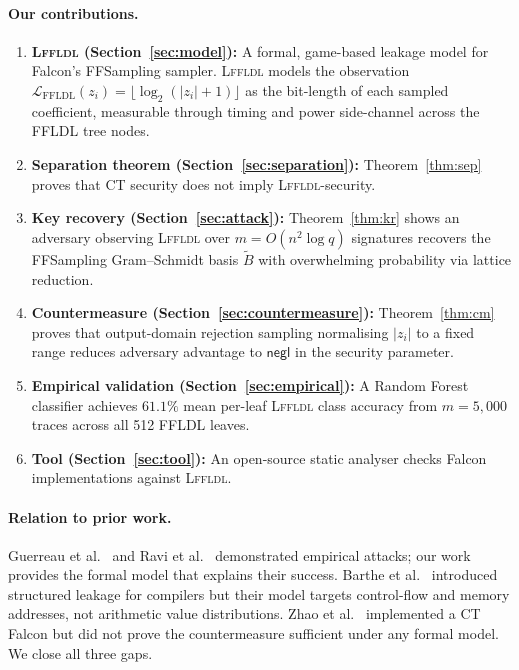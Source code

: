 \documentclass[sigconf,anonymous]{acmart}
\begin{document}
\paragraph{Our contributions.}
\begin{enumerate}
  \item \textbf{\textsc{Lffldl} (Section~\ref{sec:model}):} A formal,
    game-based leakage model for Falcon's FFSampling sampler.
    \textsc{Lffldl} models the observation
    $\mathcal{L}_{\mathrm{FFLDL}}(z_i) = \lfloor\log_2(|z_i|+1)\rfloor$
    as the bit-length of each sampled coefficient, measurable through timing
    and power side-channel across the FFLDL tree nodes.
  \item \textbf{Separation theorem (Section~\ref{sec:separation}):}
    Theorem~\ref{thm:sep} proves that CT security does not imply
    \textsc{Lffldl}-security.
  \item \textbf{Key recovery (Section~\ref{sec:attack}):}
    Theorem~\ref{thm:kr} shows an adversary observing \textsc{Lffldl} over
    $m = O(n^2\log q)$ signatures recovers the FFSampling Gram--Schmidt basis
    $\widetilde{B}$ with overwhelming probability via lattice reduction.
  \item \textbf{Countermeasure (Section~\ref{sec:countermeasure}):}
    Theorem~\ref{thm:cm} proves that output-domain rejection sampling
    normalising $|z_i|$ to a fixed range reduces adversary advantage to
    $\mathsf{negl}$ in the security parameter.
  \item \textbf{Empirical validation (Section~\ref{sec:empirical}):}
    A Random Forest classifier achieves $61.1\%$ mean per-leaf
    \textsc{Lffldl} class accuracy from $m = 5{,}000$ traces across all
    512 FFLDL leaves.
  \item \textbf{Tool (Section~\ref{sec:tool}):} An open-source static
    analyser checks Falcon implementations against \textsc{Lffldl}.
\end{enumerate}

\paragraph{Relation to prior work.}
Guerreau et al.~\cite{guerreau2022} and Ravi et al.~\cite{ravi2023}
demonstrated empirical attacks; our work provides the formal model that
explains their success.  Barthe et al.~\cite{barthe2014} introduced structured
leakage for compilers but their model targets control-flow and memory
addresses, not arithmetic value distributions.  Zhao et al.~\cite{zhao2023ct}
implemented a CT Falcon but did not prove the countermeasure sufficient under
any formal model.  We close all three gaps.
\end{document}
